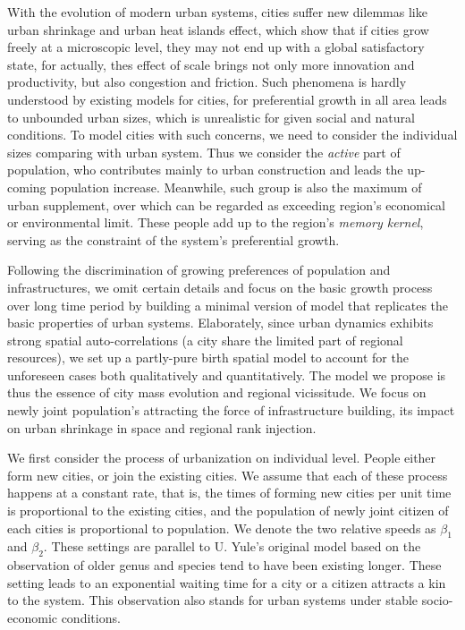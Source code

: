 \documentclass[reprint,unsortedaddress,amsmath,amssymb,aps,prl,fixfloat,showkeys]{revtex4-2}
\begin{document}
With the evolution of modern urban systems, cities suffer new dilemmas like urban shrinkage\cite{haase2014conceptualizing,martinez2012shrinking} and urban heat islands effect\cite{PhysRevLett.120.108701,manoli2019magnitude}, which show that if cities grow freely at a microscopic level, they may not end up with a global satisfactory state, for actually, thes effect of scale\cite{batty2013new} brings not only more innovation and productivity, but also congestion and friction. Such phenomena is hardly understood by existing models for cities, for preferential growth in all area leads to unbounded urban sizes, which is unrealistic for given social and natural conditions. To model cities with such concerns, we need to consider the individual sizes comparing with urban system. Thus we consider the \emph{active} part of population, who contributes mainly to urban construction and leads the up-coming population increase. Meanwhile, such group is also the maximum of urban supplement, over which can be regarded as exceeding region's economical or environmental limit. These people add up to the region's \emph{memory kernel}, serving as the constraint of the system's preferential growth\cite{PhysRevE.97.022132}.

Following the discrimination of growing preferences of population and infrastructures, we omit certain details and focus on the basic growth process over long time period by building a minimal version of model that replicates the basic properties of urban systems. Elaborately, since urban dynamics exhibits strong spatial auto-correlations (a city share the limited part of regional resources), we set up a partly-pure birth spatial model to account for the unforeseen cases both qualitatively and quantitatively. The model we propose is thus the essence of  city mass evolution and regional vicissitude. We focus on newly joint population's attracting the force of infrastructure building, its impact on urban shrinkage in space and regional rank injection. 

We first consider the process of urbanization on individual level. People either form new cities, or join the existing cities. We assume that each of these process happens at a constant rate, that is, the times of forming new cities per unit time is proportional to the existing cities, and the population of newly joint citizen of each cities is proportional to population. We denote the two relative speeds as $\beta_1$ and $\beta_2$. These settings are parallel to U. Yule's original model\cite{yule1925ii} based on the observation of older genus and species tend to have been existing longer. These setting leads to an exponential waiting time for a city or a citizen attracts a kin to the system. This observation also stands for urban systems under stable socio-economic conditions. %
\end{document}
